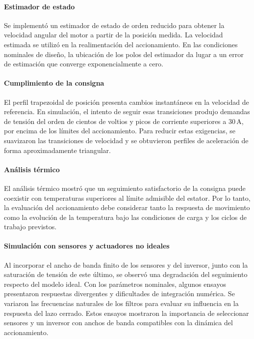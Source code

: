 \documentclass[blue,fullpaper]{ludusofficial}  %
\begin{document}
\paragraph{Estimador de estado}
Se implementó un estimador de estado de orden reducido para
obtener la velocidad angular del motor a partir de la posición
medida. La velocidad estimada se utilizó en la realimentación
del accionamiento. En las condiciones nominales de diseño,
la ubicación de los polos del estimador da lugar a un error
de estimación que converge exponencialmente a cero.

\paragraph{Cumplimiento de la consigna}
El perfil trapezoidal de posición presenta cambios instantáneos
en la velocidad de referencia. En simulación, el intento de seguir
esas transiciones produjo demandas de tensión del orden de cientos
de voltios y picos de corriente superiores a $30\,\mathrm{A}$,
por encima de los límites del accionamiento. Para reducir estas
exigencias, se suavizaron las transiciones de velocidad y se
obtuvieron perfiles de aceleración de forma aproximadamente
triangular.

\paragraph{Análisis térmico}
El análisis térmico mostró que un seguimiento satisfactorio
de la consigna puede coexistir con temperaturas superiores al
límite admisible del estator. Por lo tanto, la evaluación del
accionamiento debe considerar tanto la respuesta de movimiento
como la evolución de la temperatura bajo las condiciones de
carga y los ciclos de trabajo previstos.

\paragraph{Simulación con sensores y actuadores no ideales}
Al incorporar el ancho de banda finito de los sensores y del
inversor, junto con la saturación de tensión de este último,
se observó una degradación del seguimiento respecto del modelo
ideal. Con los parámetros nominales, algunos ensayos presentaron
respuestas divergentes y dificultades de integración numérica.
Se variaron las frecuencias naturales de los filtros para evaluar
su influencia en la respuesta del lazo cerrado. Estos ensayos
mostraron la importancia de seleccionar sensores y un inversor
con anchos de banda compatibles con la dinámica del accionamiento.
\end{document}
